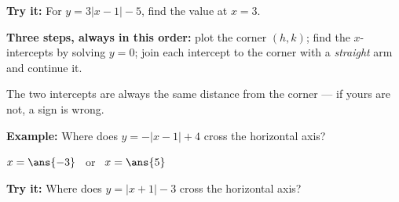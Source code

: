 \documentclass[12pt]{article}
\begin{document}
\begin{tryitbox}
\textbf{Try it:} \quad For $y = 3|x-1| - 5$, find the value at $x = 3$.\\[2pt]
\end{tryitbox}


\begin{formulabox}
\textbf{Three steps, always in this order:} plot the corner $(h,k)$; find the $x$-intercepts by solving $y = 0$; join each intercept to the corner with a \emph{straight} arm and continue it.\par\smallskip
The two intercepts are always the same distance from the corner --- if yours are not, a sign is wrong.
\end{formulabox}

\begin{examplebox}
\textbf{Example:} \quad Where does $y = -|x-1| + 4$ cross the horizontal axis?
\par
$x = \ans{-3}$ \ or \ $x = \ans{5}$
\end{examplebox}

\begin{tryitbox}
\textbf{Try it:} \quad Where does $y = |x+1| - 3$ cross the horizontal axis?\\[2pt]
\end{tryitbox}
\end{document}
